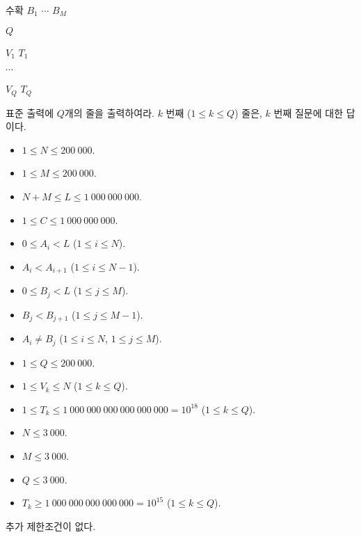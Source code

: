 \begin{problem}{수확}
	$B_1$ $\cdots$ $B_M$
	
	$Q$
	
	$V_1$ $T_1$
	
	$\cdots$

	$V_Q$ $T_Q$
	
	
	\OutputFile
	
	표준 출력에 $Q$개의 줄을 출력하여라. $k$ 번째 ($1 \le k \le Q$) 줄은, $k$ 번째 질문에 대한 답이다.
	

	\Constraints


	\begin{itemize}
		\item $1 \le N \le 200\ 000$.
		\item $1 \le M \le 200\ 000$.
		\item $N+M \le L \le 1\ 000\ 000\ 000$.
		\item $1 \le C \le 1\ 000\ 000\ 000$.
		\item $0 \le A_i < L$ ($1 \le i \le N$).
		\item $A_i < A_{i+1}$ ($1 \le i \le N-1$).
		\item $0 \le B_j < L$ ($1 \le j \le M$).
		\item $B_j < B_{j+1}$ ($1 \le j \le M-1$).
		\item $A_i \ne B_j$ ($1 \le i \le N$, $1 \le j \le M$).
		\item $1 \le Q \le 200\ 000$.
		\item $1 \le V_k \le N$ ($1 \le k \le Q$).
		\item $1 \le T_k \le 1\ 000\ 000\ 000\ 000\ 000\ 000 = 10^{18}$ ($1 \le k \le Q$).
	\end{itemize}


	\begin{itemize}
		\item $N \le 3\ 000$.
		\item $M \le 3\ 000$.
		\item $Q \le 3\ 000$.
	\end{itemize}

	
	\begin{itemize}
		\item $T_k \ge 1\ 000\ 000\ 000\ 000\ 000 = 10^{15}$ ($1 \le k \le Q$).
	\end{itemize}
	
	
	추가 제한조건이 없다.
		
	\Examples
		
	\begin{example}
\end{example}


\end{problem}
